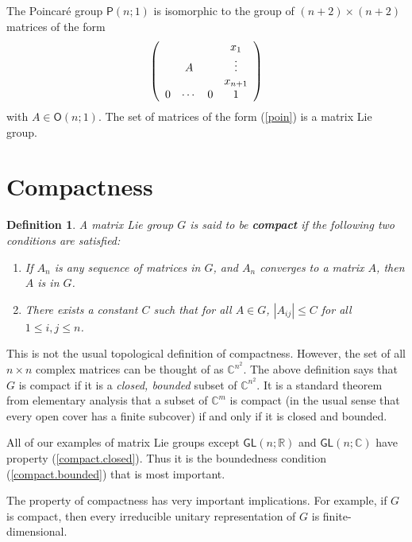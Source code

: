 \documentclass[12pt]{amsbook}
\theoremstyle{plain}
\newtheorem{definition}[theorem]{Definition}
\numberwithin{equation}{chapter}
\numberwithin{theorem}{chapter}
\begin{document}
The Poincar\'{e} group $\mathsf{P}(n;1)$ is isomorphic to the group of
$(n+2)\times(n+2)$ matrices of the form
\begin{equation}
\left(
\begin{array}
[c]{cccc}%
&  &  & x_{1}\\
& A &  & \vdots\\
&  &  &  x_{n+1}\\
0 & \cdots & 0 & 1
\end{array}
\right) \label{poin}%
\end{equation}
with $A\in\mathsf{O}(n;1)$. The set of matrices of the form (\ref{poin}) is a
matrix Lie group.

\section{Compactness}

\begin{definition}
A matrix Lie group $G$ is said to be \textbf{compact} if the following two
conditions are satisfied:

\begin{enumerate}
\item \label{compact.closed}If $A_{n}$ is any sequence of matrices in $G$, and
$A_{n}$ converges to a matrix $A$, then $A$ is in $G$.

\item \label{compact.bounded}There exists a constant $C$ such that for all
$A\in G$, $\left|  A_{ij}\right|  \leq C$ for all $1\leq i,j\leq n$.
\end{enumerate}
\end{definition}

This is not the usual topological definition of compactness. However, the set
of all $n\times n$ complex matrices can be thought of as $\mathbb{C}^{n^{2}}$.
The above definition says that $G$ is compact if it is a \textit{closed,
bounded} subset of $\mathbb{C}^{n^{2}}$. It is a standard theorem from
elementary analysis that a subset of $\mathbb{C}^{m}$ is compact (in the usual
sense that every open cover has a finite subcover) if and only if it is closed
and bounded.

All of our examples of matrix Lie groups except $\mathsf{GL}(n;\mathbb{R})$
and $\mathsf{GL}(n;\mathbb{C})$ have property (\ref{compact.closed}). Thus it
is the boundedness condition (\ref{compact.bounded}) that is most important.

The property of compactness has very important implications. For example, if
$G$ is compact, then every irreducible unitary representation of $G$ is finite-dimensional.
\end{document}
